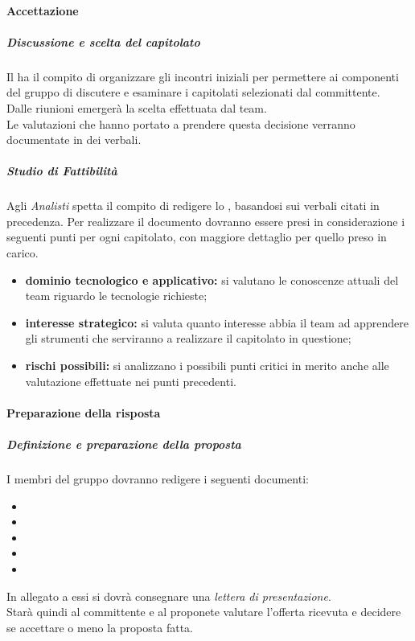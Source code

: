			\paragraph{Accettazione}
				\subparagraph{Discussione e scelta del capitolato}
Il \roleProjectManager{} ha il compito di organizzare	gli incontri iniziali per permettere ai componenti del gruppo di discutere e esaminare i capitolati selezionati dal committente\gloss{}. \\
Dalle riunioni emergerà la scelta effettuata dal team. \\
Le valutazioni che hanno portato a prendere questa decisione verranno documentate in dei verbali.
				\subparagraph{Studio di Fattibilità}
Agli \emph{Analisti} spetta il compito di redigere lo \docNameVersionSdF{}, basandosi sui verbali citati in precedenza.
Per realizzare il documento dovranno essere presi in considerazione i seguenti punti per ogni capitolato, con maggiore dettaglio per quello preso in carico.
					\begin{itemize}
						\item \textbf{dominio tecnologico e applicativo:} si valutano le conoscenze attuali del team riguardo le tecnologie richieste;
						\item \textbf{interesse strategico:} si valuta quanto interesse abbia il team ad apprendere gli strumenti che serviranno a realizzare il capitolato in questione;
						\item \textbf{rischi possibili:} si analizzano i possibili punti critici in merito anche alle valutazione effettuate nei punti precedenti.
					\end{itemize}
			\paragraph{Preparazione della risposta}
				\subparagraph{Definizione e preparazione della proposta}
I membri del gruppo \groupName{} dovranno redigere i seguenti documenti: \\
					\begin{itemize}
						\item \docNameVersionSdF
						\item \docNameVersionAdR
						\item \docNameVersionPdP
						\item \docNameVersionPdQ
						\item \docNameVersionNdP
					\end{itemize}
In allegato a essi si dovrà consegnare una \emph{lettera di presentazione}. \\
Starà quindi al committente\gloss{} e al proponete valutare l'offerta ricevuta e decidere se accettare o meno la proposta fatta.
					
